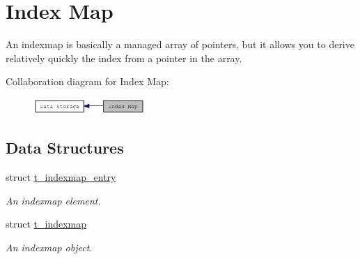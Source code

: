 \hypertarget{group__indexmap}{
\section{Index Map}
\label{group__indexmap}
}


An indexmap is basically a managed array of pointers, but it allows you to derive relatively quickly the index from a pointer in the array.  


Collaboration diagram for Index Map:\nopagebreak
\begin{figure}[H]
\begin{center}
\leavevmode
\includegraphics[width=120pt]{group__indexmap}
\end{center}
\end{figure}
\subsection*{Data Structures}
\begin{DoxyCompactItemize}
\item 
struct \hyperlink{structt__indexmap__entry}{t\_\-indexmap\_\-entry}
\begin{DoxyCompactList}\small\item\em An indexmap element. \item\end{DoxyCompactList}\item 
struct \hyperlink{structt__indexmap}{t\_\-indexmap}
\begin{DoxyCompactList}\small\item\em An indexmap object. \item\end{DoxyCompactList}\end{DoxyCompactItemize}
